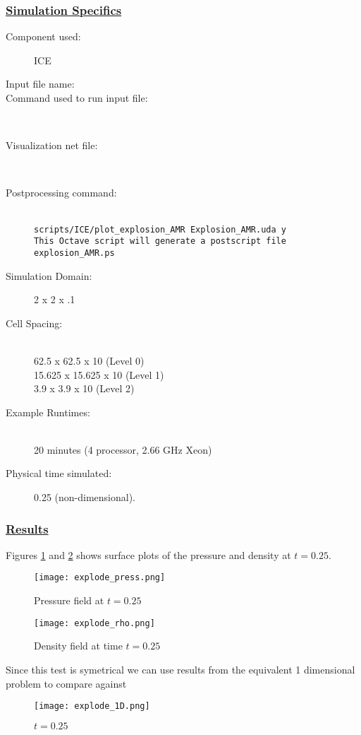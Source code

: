 \subsubsection*{\underline{Simulation Specifics}}
\begin{description} 
\item [Component used:] \hfill ICE
\item [Input file name:] \hfill {}
\item [Command used to run input file:]\hfill \\
\item [Visualization net file:]\hfill {}\\
\item [Postprocessing command:]\hfill \\
\tt scripts/ICE/plot\_explosion\_AMR Explosion\_AMR.uda y \normalfont \\
This Octave script will generate a postscript file explosion\_AMR.ps


\item [Simulation Domain:]\hfill    2 x 2 x .1
\item [Cell Spacing:]\hfill \\ 
62.5    x 62.5    x 10 (Level 0)\\
15.625  x 15.625  x 10 (Level 1)\\
3.9     x 3.9     x 10 (Level 2)

\item [Example Runtimes:] \hfill \\
 20 minutes   (4 processor, 2.66 GHz Xeon)

\item [Physical time simulated:] \hfill 0.25 (non-dimensional).
\end{description}
%
\subsubsection*{\underline{Results}}
Figures \ref{fig:pressExplode} and \ref{fig:rhoExplode} shows surface plots of the pressure and density at $t=0.25.$  
\begin{figure}
 \texttt{[image: explode\_press.png]}
\caption{Pressure field at $t=0.25$}
\label{fig:pressExplode}
\end{figure}
%
\begin{figure}
  \texttt{[image: explode\_rho.png]}
  \caption{Density field at time $t=0.25$}
  \label{fig:rhoExplode}
\end{figure}
%
Since this test is symetrical we can use results from the equivalent 1 dimensional problem to compare against
%
\begin{figure}
  \texttt{[image: explode\_1D.png]}
  \caption{$t=0.25$}
  \label{fig:1dExplode}
\end{figure}
\newpage

